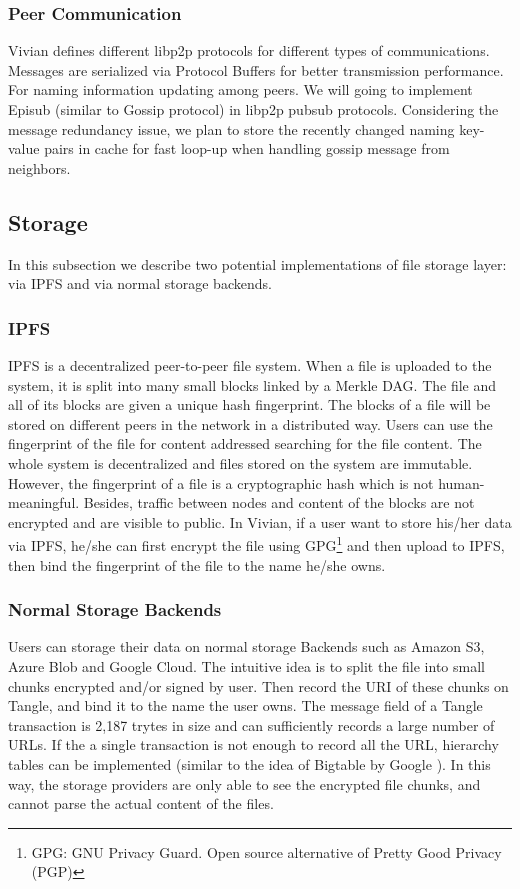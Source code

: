 \subsubsection{Peer Communication}
Vivian defines different libp2p protocols for different types of communications.
Messages are serialized via Protocol Buffers for better transmission performance.
For naming information updating among peers. We will going to implement Episub (similar to Gossip protocol) in libp2p pubsub protocols.
Considering the message redundancy issue, we plan to store the recently changed naming key-value pairs in cache for fast loop-up when handling gossip message from neighbors.

\subsection{Storage}
In this subsection we describe two potential implementations of file storage layer: via IPFS and via normal storage backends.

\subsubsection{IPFS}
IPFS is a decentralized peer-to-peer file system. When a file is uploaded to the system, it is split into many small blocks linked by a Merkle DAG.
The file and all of its blocks are given a unique hash fingerprint. The blocks of a file will be stored on different peers in the network in a distributed way.
Users can use the fingerprint of the file for content addressed searching for the file content.
The whole system is decentralized and files stored on the system are immutable. However, the fingerprint of a file is a cryptographic hash which is not human-meaningful.
Besides, traffic between nodes and content of the blocks are not encrypted and are visible to public.
In Vivian, if a user want to store his/her data via IPFS, he/she can first encrypt the file using GPG\footnote{GPG: GNU Privacy Guard. Open source alternative of Pretty Good Privacy (PGP)} and then upload to IPFS, then bind the fingerprint of the file to the name he/she owns.

\subsubsection{Normal Storage Backends}
Users can storage their data on normal storage Backends such as Amazon S3, Azure Blob and Google Cloud.
The intuitive idea is to split the file into small chunks encrypted and/or signed by user.
Then record the URI of these chunks on Tangle, and bind it to the name the user owns.
The message field of a Tangle transaction is 2,187 trytes in size and can sufficiently records a large number of URLs.
If the a single transaction is not enough to record all the URL, hierarchy tables can be implemented (similar to the idea of Bigtable by Google \cite{chang2008bigtable}).
In this way, the storage providers are only able to see the encrypted file chunks, and cannot parse the actual content of the files.